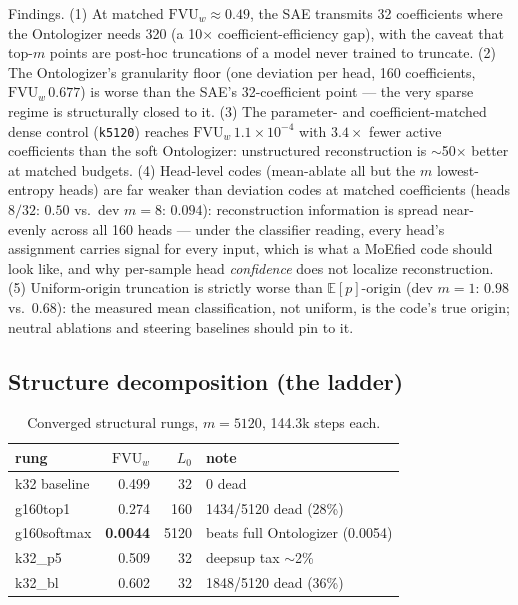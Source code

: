 \documentclass[11pt]{article}
\newcommand{\fvu}{\mathrm{FVU}_w}
\begin{document}
Findings. (1) At matched $\fvu \approx 0.49$, the SAE transmits 32
coefficients where the Ontologizer needs 320 (a 10$\times$
coefficient-efficiency gap), with the caveat that top-$m$ points are
post-hoc truncations of a model never trained to truncate. (2) The
Ontologizer's granularity floor (one deviation per head, 160 coefficients,
$\fvu\,0.677$) is worse than the SAE's 32-coefficient point --- the very
sparse regime is structurally closed to it. (3) The parameter- and
coefficient-matched dense control (\texttt{k5120}) reaches
$\fvu\,1.1\times10^{-4}$ with $3.4\times$ fewer active coefficients than
the soft Ontologizer: unstructured reconstruction is $\sim$50$\times$
better at matched budgets. (4) Head-level codes (mean-ablate all but the
$m$ lowest-entropy heads) are far weaker than deviation codes at matched
coefficients (heads $8/32$: $0.50$ vs.\ dev $m{=}8$: $0.094$):
reconstruction information is spread near-evenly across all 160 heads ---
under the classifier reading, every head's assignment carries signal for
every input, which is what a MoEfied code should look like, and why
per-sample head \emph{confidence} does not localize reconstruction.
(5) Uniform-origin truncation is strictly worse than
$\mathbb{E}[p]$-origin (dev $m{=}1$: $0.98$ vs.\ $0.68$): the measured
mean classification, not uniform, is the code's true origin; neutral
ablations and steering baselines should pin to it.

\subsection{Structure decomposition (the ladder)}

\begin{table}[h]\centering\small
\begin{tabular}{@{}lrrl@{}}
\toprule
rung & $\fvu$ & $L_0$ & note \\
\midrule
k32 baseline    & 0.499 & 32   & 0 dead \\
g160top1        & 0.274 & 160  & 1434/5120 dead (28\%) \\
g160softmax     & \textbf{0.0044} & 5120 & beats full Ontologizer (0.0054) \\
k32\_p5         & 0.509 & 32   & deepsup tax $\sim$2\% \\
k32\_bl         & 0.602 & 32   & 1848/5120 dead (36\%) \\
\bottomrule
\end{tabular}
\caption{Converged structural rungs, $m{=}5120$, 144.3k steps each.}
\end{table}
\end{document}

